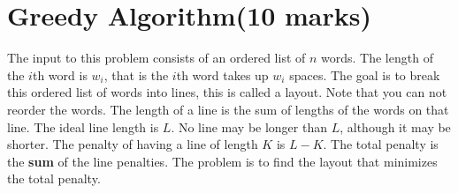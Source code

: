 \documentclass[a4paper,11pt]{article}
\begin{document}
\section{Greedy Algorithm(10 marks)}
The input to this problem consists of an ordered list of $n$ words. The length of the $i$th word is $w_i$, that is the $i$th word takes up $w_i$ spaces. The goal is to break this ordered list of words into lines, this is called a layout. Note that you can not reorder the words. The length of a line is the sum of lengths of the words on that line. The ideal line length is $L$. No line may be longer than $L$, although it may be shorter. The penalty of having a line of length $K$ is $L-K$. The total penalty is the {\bf sum} of the line penalties. The problem is to find the layout that minimizes the total penalty.
\end{document}
